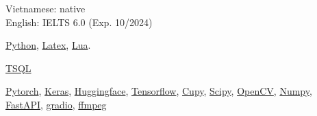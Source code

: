 \documentclass{src/preamble/doc_class}
\begin{document}
	\begin{SideBar}{\ColorBackground}{\ColorTextSide}


      	\begin{minipage}[t][1.25cm]{6cm}
        \vspace{-1.5mm}
        Vietnamese: native\\
        English: IELTS 6.0 (Exp. 10/2024)
        \end{minipage}

		\begin{minipage}[t][0.75cm]{6cm}
        \vspace{-1.5mm}
        \href{https://www.python.org/}{Python}, \href{https://www.tug.org/texlive/}{Latex}, \href{https://www.lua.org/}{Lua}.
        \end{minipage}

        \begin{minipage}[t][0.75cm]{6cm}
        \vspace{-1.5mm}
         \href{https://www.microsoft.com/en-us/sql-server}{TSQL}
        \end{minipage}

        \begin{minipage}[t][1.65cm]{6cm}
        \vspace{-1.5mm}
        \href{https://pytorch.org/}{Pytorch}, \href{https://keras.io/}{Keras}, \href{https://huggingface.co/}{Huggingface}, \href{https://www.tensorflow.org/}{Tensorflow}, \href{https://cupy.dev/}{Cupy}, \href{https://scipy.org/}{Scipy}, \href{https://opencv.org/}{OpenCV},  \href{https://numpy.org/doc/stable/reference/generated/numpy.save.html}{Numpy}, \href{https://fastapi.tiangolo.com/about/}{FastAPI}, \href{https://www.gradio.app/}{gradio}, \href{https://ffmpeg.org/}{ffmpeg}
        \end{minipage}


\end{SideBar}
\end{document}
